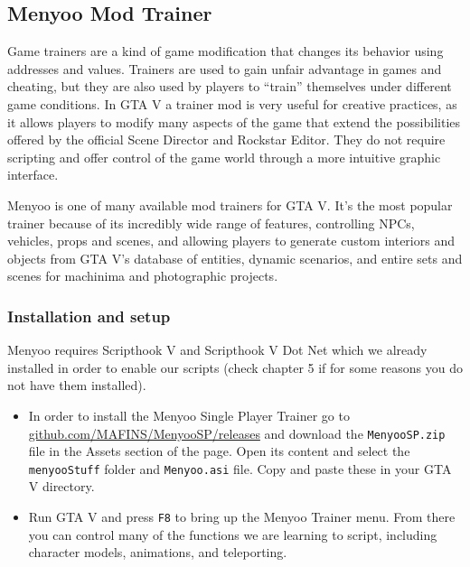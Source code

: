 \documentclass[
  openany]{book}
\begin{document}
\hypertarget{menyoo-mod-trainer}{%
\subsection*{Menyoo Mod Trainer}\label{menyoo-mod-trainer}}

Game trainers are a kind of game modification that changes its behavior using addresses and values. Trainers are used to gain unfair advantage in games and cheating, but they are also used by players to ``train'' themselves under different game conditions. In GTA V a trainer mod is very useful for creative practices, as it allows players to modify many aspects of the game that extend the possibilities offered by the official Scene Director and Rockstar Editor. They do not require scripting and offer control of the game world through a more intuitive graphic interface.

Menyoo is one of many available mod trainers for GTA V. It's the most popular trainer because of its incredibly wide range of features, controlling NPCs, vehicles, props and scenes, and allowing players to generate custom interiors and objects from GTA V's database of entities, dynamic scenarios, and entire sets and scenes for machinima and photographic projects.

\hypertarget{installation-and-setup}{%
\subsubsection*{Installation and setup}\label{installation-and-setup}}

Menyoo requires Scripthook V and Scripthook V Dot Net which we already installed in order to enable our scripts (check chapter 5 if for some reasons you do not have them installed).

\begin{itemize}
\item
  In order to install the Menyoo Single Player Trainer go to \href{https://github.com/MAFINS/MenyooSP/releases}{github.com/MAFINS/MenyooSP/releases} and download the \texttt{MenyooSP.zip} file in the Assets section of the page. Open its content and select the \texttt{menyooStuff} folder and \texttt{Menyoo.asi} file. Copy and paste these in your GTA V directory.
\item
  Run GTA V and press \texttt{F8} to bring up the Menyoo Trainer menu. From there you can control many of the functions we are learning to script, including character models, animations, and teleporting.
\end{itemize}
\end{document}
